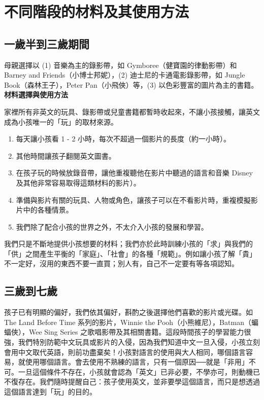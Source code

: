\section{不同階段的材料及其使用方法}
\subsection{一歲半到三歲期間}
母親選擇以 (1) 音樂為主的錄影帶，如 Gymboree（健寶園的律動影帶）和 Barney and Friends（小博士邦妮），(2) 迪士尼的卡通電影錄影帶，如 Jungle Book（森林王子），Peter Pan（小飛俠）等，(3) 以色彩豐富的圖片為主的書籍。\\

\textbf{材料選擇與使用方法} %

家裡所有非英文的玩具、錄影帶或兒童書籍都暫時收起來，不讓小孩接觸，讓英文成為小孩唯一的「玩」的取材來源。
\begin{enumerate}
\item 每天讓小孩看 1 - 2 小時，每次不超過一個影片的長度（約一小時）。
\item 其他時間讓孩子翻閱英文圖書。
\item 在孩子玩的時候放錄音帶，讓他重複聽他在影片中聽過的語言和音樂 Disney 及其他非常容易取得這類材料的影片）。
\item 準備與影片有關的玩具、人物或角色，讓孩子可以在不看影片時，重複模擬影片中的各種情景。
\item 我們除了配合小孩的世界之外，不太介入小孩的發展和學習。
\end{enumerate}
我們只是不斷地提供小孩想要的材料；我們亦於此時訓練小孩的「求」與我們的「供」之間產生平衡的「家庭」、「社會」的各種「規範」。例如讓小孩了解「貴」不一定好，沒用的東西不要一直買；別人有，自己不一定要有等各項認知。

\subsection{三歲到七歲}
孩子已有明顯的偏好，我們依其偏好，斟酌之後選擇他們喜歡的影片或光碟。如 The Land Before Time 系列的影片，Winnie the Pooh（小熊維尼），Batman（蝙蝠俠），Wee Sing Series 之歌唱影帶及其相關書籍。這段時間孩子的學習能力很強，我們特別防範中文玩具或影片的入侵，因為我們知道中文一旦入侵，小孩立刻會用中文取代英語，則前功盡棄矣！小孩對語言的使用與大人相同，哪個語言容易，就使用哪個語言。會去使用不熟練的語言，只有一個原因──就是「非用」不可。一旦這個條件不存在，小孩就會認為「英文」已非必要，不學亦可，則動機已不復存在。我們隨時提醒自己：孩子使用英文，並非要學這個語言，而只是想透過這個語言達到「玩」的目的。\\

